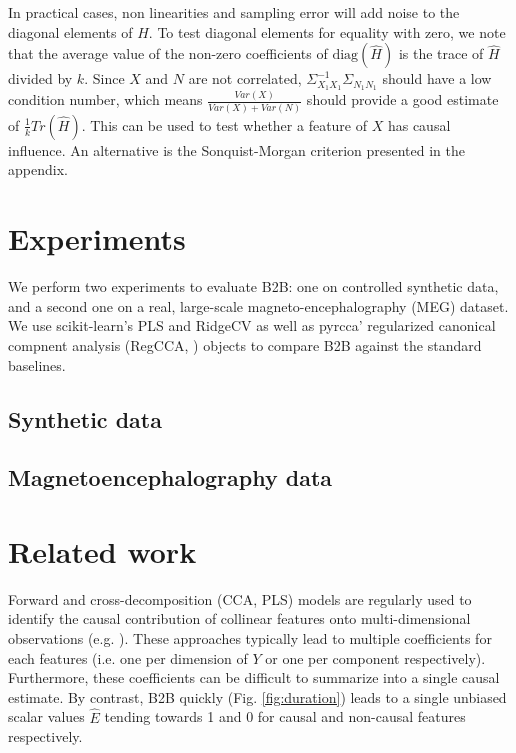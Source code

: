 \documentclass{article}
\begin{document}
In practical cases, non linearities and sampling error will add noise to the diagonal elements of $\hat H$. To test diagonal elements for equality with zero, we note that the average value of the non-zero coefficients of $\text{diag}(\hat H)$ is the trace of $\hat H$ divided by $k$. Since $X$ and $N$ are not correlated, $\Sigma_{X_1 X_1}^{-1}\Sigma_{N_1 N_1}$ should have a low condition number, which means $\frac{Var(X)}{Var(X)+Var(N)}$ should provide a good estimate of $\frac{1}{k}Tr(\hat H)$. This can be used to test whether a feature of $X$ has causal influence. An alternative is the Sonquist-Morgan criterion presented in the appendix.

\section{Experiments}

We perform two experiments to evaluate B2B: one on controlled synthetic data, and a second one on a real, large-scale magneto-encephalography (MEG) dataset.
%
We use scikit-learn's PLS and RidgeCV \citep{sklearn} as well as pyrcca' regularized canonical compnent analysis (RegCCA, \citep{bilenko2016pyrcca}) objects to compare B2B against the standard baselines.

\subsection{Synthetic data}
\label{sec:experiment_synthetic}



\subsection{Magnetoencephalography data}
\label{sec:experiment_real}



\section{Related work}

Forward and cross-decomposition (CCA, PLS) models are regularly used to identify the causal contribution of collinear features onto multi-dimensional observations (e.g. \citep{naselaris2011encoding}). These approaches typically lead to multiple coefficients for each features (i.e. one per dimension of $Y$ or one per component respectively). Furthermore, these  coefficients can be difficult to summarize into a single causal estimate. By contrast, B2B quickly (Fig. \ref{fig:duration}) leads to a single unbiased scalar values $\hat E$ tending towards 1 and 0 for causal and non-causal features respectively.
\end{document}
